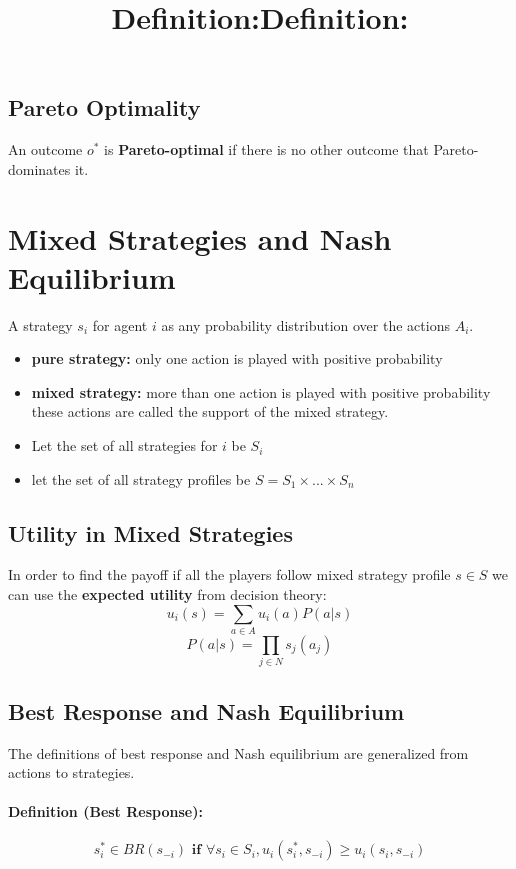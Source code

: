 \documentclass[10pt,a4paper]{report}
\begin{document}
\subsection{Pareto Optimality}
\title{\textbf{Definition:}}
An outcome $o^*$ is \textbf{Pareto-optimal} if there is no other outcome that Pareto-dominates it.
\section{Mixed Strategies and Nash Equilibrium}
\title{\textbf{Definition:}}
A strategy $s_i$ for agent $i$ as any probability distribution over the actions $A_i$.
\begin{itemize}
\item \textbf{pure strategy:} only one action is played with positive probability
\item \textbf{mixed strategy:} more than one action is played with positive probability
\bigbreak
these actions are called the support of the mixed strategy.
\item Let the set of all strategies for $i$ be $S_i$
\item let the set of all strategy profiles be $S = S_1 \times... \times S_n$
\end{itemize}
\subsection{Utility in Mixed Strategies}
In order to find the payoff if all the players follow mixed strategy profile $s \in S$ we can use the \textbf{expected utility} from decision theory: 
\begin{equation} u_i(s) = \sum_{a \in A}u_i(a)P(a|s)\end{equation}
\begin{equation} P(a|s) = \prod_{j \in N}s_j(a_j)\end{equation}
\subsection{Best Response and Nash Equilibrium}The definitions of best response and Nash equilibrium are generalized from actions to strategies. 

\paragraph{Definition (Best Response): }
$$ s_i^* \in BR(s_{-i}) \textbf{ if }   \forall s_i \in S_i, u_i(s_i^*,s_{-i}) \geq u_i(s_i, s_{-i})$$ 
\end{document}
